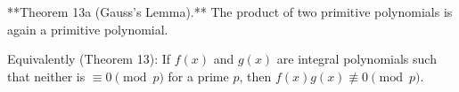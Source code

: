 **Theorem 13a (Gauss's Lemma).** The product of two primitive polynomials is again a primitive polynomial.

Equivalently (Theorem 13): If $f(x)$ and $g(x)$ are integral polynomials such that neither is $\equiv 0 \pmod{p}$ for a prime $p$, then $f(x)g(x) \not\equiv 0 \pmod{p}$.
